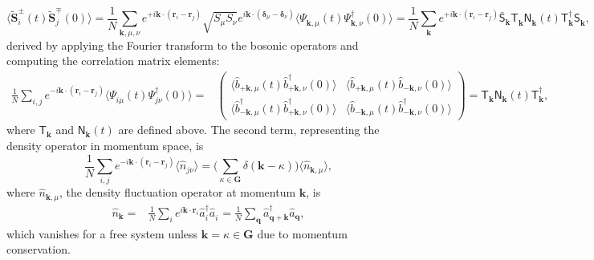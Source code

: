 \documentclass[aps, prx, nofootinbib, superscriptaddress]{revtex4-2}
\newcommand{\kvec}{\mathbf{k}}
\begin{document}
\begin{equation}
    \big\langle \widetilde{\mathbf{S}}_{i}^{\pm}(t) \widetilde{\mathbf{S}}_{j}^{\mp}(0) \big\rangle
    = \frac{1}{N} \sum_{\kvec, \mu, \nu } 
    e^{ + i \kvec \cdot (\mathbf{r}_{i} - \mathbf{r}_{j} )} 
    \sqrt{S_{\mu} S_{\nu}} 
    e^{ i \kvec \cdot (\mathbf{\delta}_{\mu} - \mathbf{\delta}_{\nu}) }
    \big\langle \Psi_{\kvec, \mu}^{\phantom \dagger}(t) \Psi_{\kvec, \nu}^{\dagger}(0) \big\rangle
    = \frac{1}{N} \sum_{\kvec} 
    e^{ + i \kvec \cdot (\mathbf{r}_{i} - \mathbf{r}_{j} )} 
    \bar{\mathsf{S}}_{\kvec}^{\phantom \dagger} 
    \mathsf{T}_{\kvec}^{\phantom \dagger}
    \mathsf{N}_{\kvec}^{\phantom \dagger} (t)
    \mathsf{T}_{\kvec}^{\dagger} 
    \mathsf{S}_{\kvec}^{\phantom \dagger},
\end{equation}
derived by applying the Fourier transform to the bosonic operators and computing the correlation matrix elements:
\begin{align}
    \frac{1}{N} \sum_{i,j} e^{ - i \kvec \cdot (\mathbf{r}_{i} - \mathbf{r}_{j} )} 
    \big\langle \Psi_{i\mu}^{\phantom \dagger}(t) \Psi_{j\nu}^{\dagger}(0) \big\rangle 
    = & 
    \begin{pmatrix}
        \big\langle \hat{b}_{+\kvec, \mu}^{\phantom \dagger} (t) \hat{b}_{+\kvec, \nu}^{\dagger}          (0) \big\rangle &
        \big\langle \hat{b}_{+\kvec, \mu}^{\phantom \dagger} (t) \hat{b}_{-\kvec, \nu}^{\phantom \dagger} (0) \big\rangle \\
        \big\langle \hat{b}_{-\kvec, \mu}^{\dagger}          (t) \hat{b}_{+\kvec, \nu}^{\dagger}          (0) \big\rangle &
        \big\langle \hat{b}_{-\kvec, \mu}^{\phantom \dagger} (t) \hat{b}_{-\kvec, \nu}^{\dagger}          (0) \big\rangle 
    \end{pmatrix}
    = \mathsf{T}_{\kvec}^{\phantom\dagger} \mathsf{N}_{\kvec}^{\phantom\dagger} (t) \mathsf{T}_{\kvec}^{\dagger},
\end{align}
where $\mathsf{T}_{\kvec}$ and $\mathsf{N}_{\kvec}(t)$ are defined above. The second term, representing the density operator in momentum space, is
\begin{equation}
    \frac{1}{N} \sum_{i,j} e^{- i \kvec \cdot (\mathbf{r}_{i} - \mathbf{r}_{j})} \langle \hat{n}_{j\nu} \rangle
    = \Big( \sum_{\kappa \in \mathbf{G}} \delta(\kvec - \kappa) \Big) \langle \hat{n}_{\kvec, \mu} \rangle,
\end{equation}
where $\hat{n}_{\kvec, \mu}$, the density fluctuation operator at momentum $\kvec$, is
\begin{align*}
    \hat{n}_{\kvec} 
    = & \frac{1}{N} 
    \sum_{i} e^{i \kvec \cdot \mathbf{r}_{i}} \hat{a}^{\dagger}_{i} \hat{a}_{i}^{\phantom \dagger} 
    = \frac{1}{N}  \sum_{\mathbf{q}} \hat{a}_{\mathbf{q} + \kvec}^{\dagger} \hat{a}_{\mathbf{q}}^{\phantom \dagger},
\end{align*}
which vanishes for a free system unless $\kvec = \kappa \in \mathbf{G}$ due to momentum conservation.
\end{document}
